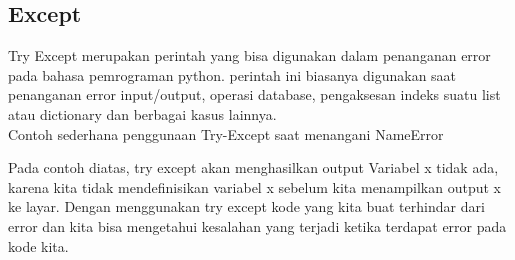 \subsection{Except}
Try Except merupakan perintah yang bisa digunakan dalam penanganan error pada bahasa pemrograman python. perintah ini biasanya digunakan saat penanganan error input/output, operasi database, pengaksesan indeks suatu list atau dictionary dan berbagai kasus lainnya.\\
Contoh sederhana penggunaan Try-Except saat menangani NameError

Pada contoh diatas, try except akan menghasilkan output Variabel x tidak ada, karena kita tidak mendefinisikan variabel x sebelum kita menampilkan output x ke layar. Dengan menggunakan try except kode yang kita buat terhindar dari error dan kita bisa mengetahui kesalahan yang terjadi ketika terdapat error pada kode kita.

